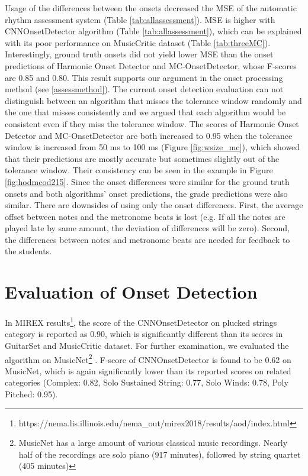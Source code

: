 Usage of the differences between the onsets decreased the MSE of the automatic rhythm assessment system (Table \ref{tab:allassessment}). MSE is higher with CNNOnsetDetector algorithm (Table \ref{tab:allassessment}), which can be explained with its poor performance on MusicCritic dataset (Table \ref{tab:threeMC}). Interestingly, ground truth onsets did not yield lower MSE than the onset predictions of Harmonic Onset Detector and MC-OnsetDetector, whose F-scores are 0.85 and 0.80. This result supports our argument in the onset processing method (see \ref{assessmethod}). The current onset detection evaluation can not distinguish between an algorithm that misses the tolerance window randomly and the one that misses consistently and we argued that each algorithm would be consistent even if they miss the tolerance window. The scores of Harmonic Onset Detector and MC-OnsetDetector are both increased to 0.95 when the tolerance window is increased from 50 ms to 100 ms (Figure \ref{fig:wsize_mc}), which showed that their predictions are mostly accurate but sometimes slightly out of the tolerance window. Their consistency can be seen in the example in Figure \ref{fig:hodmcod215}. Since the onset differences were similar for the ground truth onsets and both algorithms' onset predictions, the grade predictions were also similar. There are downsides of using only the onset differences. First, the average offset between notes and the metronome beats is lost (e.g. If all the notes are played late by same amount, the deviation of differences will be zero). Second, the differences between notes and metronome beats are needed for feedback to the students.


\section{Evaluation of Onset Detection}

In MIREX results\footnote{https://nema.lis.illinois.edu/nema\_out/mirex2018/results/aod/index.html}, the score of the CNNOnsetDetector on plucked strings category is reported as 0.90, which is significantly different than its scores in GuitarSet and MusicCritic dataset. For further examination, we evaluated the algorithm on MusicNet\footnote{MusicNet has a large amount of various classical music recordings. Nearly half of the recordings are solo piano (917 minutes), followed by string quartet (405 minutes)} \cite{thickstun}. F-score of CNNOnsetDetector is found to be 0.62 on MusicNet, which is again significantly lower than its reported scores on related categories (Complex: 0.82, Solo Sustained String: 0.77, Solo Winds: 0.78, Poly Pitched: 0.95). 


